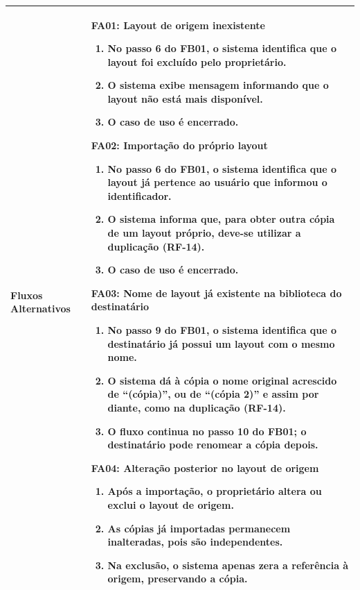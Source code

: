 \begin{longtable}{ >{\raggedright}p{2.8cm} | >{\raggedright\arraybackslash}p{10.7cm} }
Fluxos Alternativos & \mbox{}
\textbf{FA01:} Layout de origem inexistente
\vspace{2pt}
\begin{enumerate}[nosep,leftmargin=1.2em,topsep=0pt,partopsep=0pt,parsep=0pt,itemsep=0pt,after=\vspace{2pt}]
    \item No passo 6 do FB01, o sistema identifica que o layout foi excluído pelo proprietário.
    \item O sistema exibe mensagem informando que o layout não está mais disponível.
    \item O caso de uso é encerrado.
\end{enumerate}

\textbf{FA02:} Importação do próprio layout
\vspace{2pt}
\begin{enumerate}[nosep,leftmargin=1.2em,topsep=0pt,partopsep=0pt,parsep=0pt,itemsep=0pt,after=\vspace{2pt}]
    \item No passo 6 do FB01, o sistema identifica que o layout já pertence ao usuário que informou o identificador.
    \item O sistema informa que, para obter outra cópia de um layout próprio, deve-se utilizar a duplicação (RF-14).
    \item O caso de uso é encerrado.
\end{enumerate}

\textbf{FA03:} Nome de layout já existente na biblioteca do destinatário
\vspace{2pt}
\begin{enumerate}[nosep,leftmargin=1.2em,topsep=0pt,partopsep=0pt,parsep=0pt,itemsep=0pt,after=\vspace{2pt}]
    \item No passo 9 do FB01, o sistema identifica que o destinatário já possui um layout com o mesmo nome.
    \item O sistema dá à cópia o nome original acrescido de ``(cópia)'', ou de ``(cópia 2)'' e assim por diante, como na duplicação (RF-14).
    \item O fluxo continua no passo 10 do FB01; o destinatário pode renomear a cópia depois.
\end{enumerate}

\textbf{FA04:} Alteração posterior no layout de origem
\vspace{2pt}
\begin{enumerate}[nosep,leftmargin=1.2em,topsep=0pt,partopsep=0pt,parsep=0pt,itemsep=0pt,after=\vspace{2pt}]
    \item Após a importação, o proprietário altera ou exclui o layout de origem.
    \item As cópias já importadas permanecem inalteradas, pois são independentes.
    \item Na exclusão, o sistema apenas zera a referência à origem, preservando a cópia.
\end{enumerate}
\mbox{} \\ \hline


\end{longtable}
